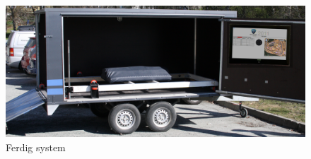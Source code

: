\begin{figure}[H]
\includegraphics[width=\textwidth]{images/cropped_samlet.JPG}
\caption{Ferdig system}
\label{fig:ferdig}
\end{figure}

